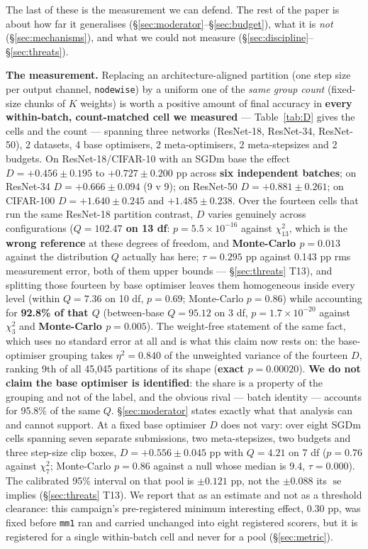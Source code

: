 \documentclass[10pt,letterpaper]{article}
\newcommand{\Dstat}{D}                         %
\newcommand{\arm}[1]{\texttt{#1}}
\DeclareMathOperator{\se}{se}
\begin{document}
The last of these is the measurement we can defend. The rest of the paper is about how far it
generalises (\S\ref{sec:moderator}--\S\ref{sec:budget}), what it is \emph{not}
(\S\ref{sec:mechanisms}), and what we could not measure
(\S\ref{sec:discipline}--\S\ref{sec:threats}).

\textbf{The measurement.} Replacing an architecture-aligned partition (one step size per
output channel, \arm{nodewise}) by a uniform one of the \emph{same group count} (fixed-size
chunks of $K$ weights) is worth a positive amount of final accuracy in \textbf{every
within-batch, count-matched cell we measured} --- Table~\ref{tab:D} gives the cells and the
count --- spanning three networks (ResNet-18, ResNet-34, ResNet-50), 2 datasets, 4 base
optimisers, 2 meta-optimisers, 2 meta-stepsizes and 2 budgets. On
ResNet-18/CIFAR-10 with an SGDm base the effect $\Dstat = +0.456 \pm 0.195$ to
$+0.727 \pm 0.200$ pp across \textbf{six independent batches}; on ResNet-34
$\Dstat = +0.666 \pm 0.094$ (9 v 9); on ResNet-50 $\Dstat = +0.881 \pm 0.261$; on CIFAR-100
$\Dstat = +1.640 \pm 0.245$ and $+1.485 \pm 0.238$. Over the fourteen cells that run the same
ResNet-18 partition contrast, $\Dstat$ varies genuinely across configurations
(\textbf{$Q = 102.47$ on 13 df}: $p = 5.5 \times 10^{-16}$ against $\chi^2_{13}$, which is the
\textbf{wrong reference} at these degrees of freedom, and \textbf{Monte-Carlo $p = 0.013$}
against the distribution $Q$ actually has here; $\tau = 0.295$ pp against 0.143 pp rms
measurement error, both of them upper bounds --- \S\ref{sec:threats} T13), and splitting those
fourteen by base optimiser leaves them homogeneous inside every level (within $Q = 7.36$ on
10 df, $p = 0.69$; Monte-Carlo $p = 0.86$) while accounting for \textbf{92.8\% of that $Q$}
(between-base $Q = 95.12$ on 3 df, $p = 1.7 \times 10^{-20}$ against $\chi^2_3$ and
\textbf{Monte-Carlo $p = 0.005$}). The weight-free statement of the same fact, which uses no
standard error at all and is what this claim now rests on: the base-optimiser grouping takes
$\eta^2 = 0.840$ of the unweighted variance of the fourteen $\Dstat$, ranking 9th of all
45{,}045 partitions of its shape (\textbf{exact $p = 0.00020$}). \textbf{We do not claim the base optimiser is
identified}: the share is a property of the grouping and not of the label, and the obvious rival
--- batch identity --- accounts for 95.8\% of the same $Q$. \S\ref{sec:moderator} states exactly
what that analysis can and cannot support. At a fixed base optimiser $\Dstat$ does not vary:
over eight SGDm cells spanning seven separate submissions,
two meta-stepsizes, two budgets and three step-size clip boxes,
$\Dstat = \mathbf{+0.556 \pm 0.045}$ pp with $Q = 4.21$ on 7 df ($p = 0.76$ against $\chi^2_7$;
Monte-Carlo $p = 0.86$ against a null whose median is 9.4, $\tau = 0.000$). The calibrated 95\%
interval on that pool is $\pm 0.121$ pp, not the $\pm 0.088$ its $\se$ implies
(\S\ref{sec:threats} T13). We
report that as an estimate and not as a threshold clearance: this campaign's pre-registered
minimum interesting effect, 0.30 pp, was fixed before \arm{mm1} ran and carried unchanged into
eight registered scorers, but it is registered for a single within-batch cell and never for a
pool (\S\ref{sec:metric}).
\end{document}

